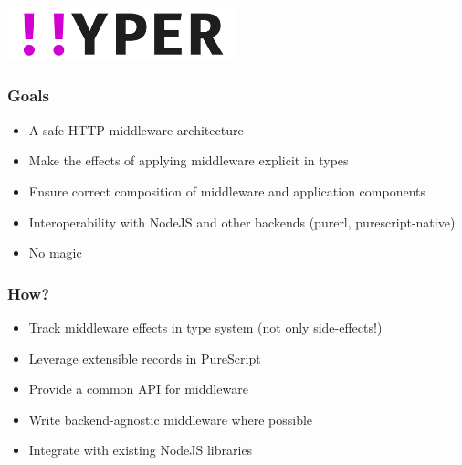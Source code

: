 %
%


\begin{frame}
  \begin{center}
    \vfill\vfill
    \includegraphics[width=0.5\textwidth]{src/graphics/hyper.png}\\
    \vspace{1em}
    \vfill\vfill
  \end{center}
\end{frame}

\begin{frame}
  \frametitle{Goals}
  \begin{itemize}
    \pause
    \item<+-> A safe HTTP middleware architecture
    \item<+-> Make the effects of applying middleware explicit in types
    \item<+-> Ensure correct composition of middleware and application components
    \item<+-> Interoperability with NodeJS and other backends (purerl, purescript-native)
    \item<+-> No magic
  \end{itemize}
\end{frame}

\begin{frame}
  \frametitle{How?}
  \begin{itemize}
    \pause
    \item<+-> Track middleware effects in type system (not only side-effects!)
    \item<+-> Leverage extensible records in PureScript
    \item<+-> Provide a common API for middleware
    \item<+-> Write backend-agnostic middleware where possible
    \item<+-> Integrate with existing NodeJS libraries
  \end{itemize}
\end{frame}

\begin{frame}
\end{frame}


